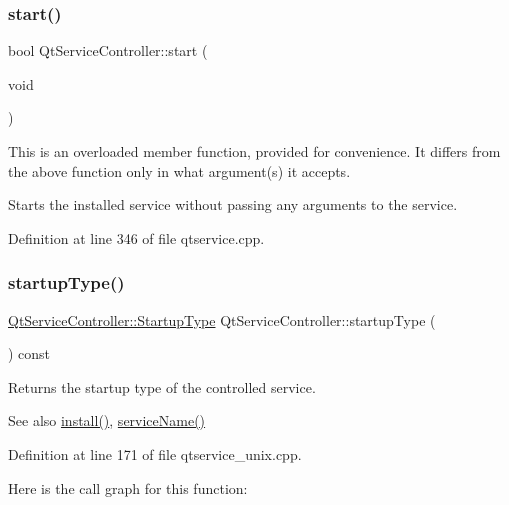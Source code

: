\subsubsection{\texorpdfstring{start()}{start()}\hspace{0.1cm}{\footnotesize\ttfamily [2/2]}}
{\footnotesize\ttfamily bool Qt\+Service\+Controller\+::start (\begin{DoxyParamCaption}\item[{void}]{ }\end{DoxyParamCaption})}

This is an overloaded member function, provided for convenience. It differs from the above function only in what argument(s) it accepts.

Starts the installed service without passing any arguments to the service. 

Definition at line 346 of file qtservice.\+cpp.

\mbox{\label{class_qt_service_controller_acfd3b5cb23c17bf415f1d606b8461109}} 
\subsubsection{\texorpdfstring{startup\+Type()}{startupType()}}
{\footnotesize\ttfamily \mbox{\hyperlink{class_qt_service_controller_a946ac2b079d9760503da923c2eaf0aac}{Qt\+Service\+Controller\+::\+Startup\+Type}} Qt\+Service\+Controller\+::startup\+Type (\begin{DoxyParamCaption}{ }\end{DoxyParamCaption}) const}

Returns the startup type of the controlled service.

\begin{DoxySeeAlso}{See also}
\mbox{\hyperlink{class_qt_service_controller_a7e2b85e911ff152557dd25959e76094b}{install()}}, \mbox{\hyperlink{class_qt_service_controller_a3df972ecd01a00fff5cda316ae35cbea}{service\+Name()}} 
\end{DoxySeeAlso}


Definition at line 171 of file qtservice\+\_\+unix.\+cpp.

Here is the call graph for this function\+:
\mbox{\label{class_qt_service_controller_ad06afa647666769e309474b18bf7cf90}} 

